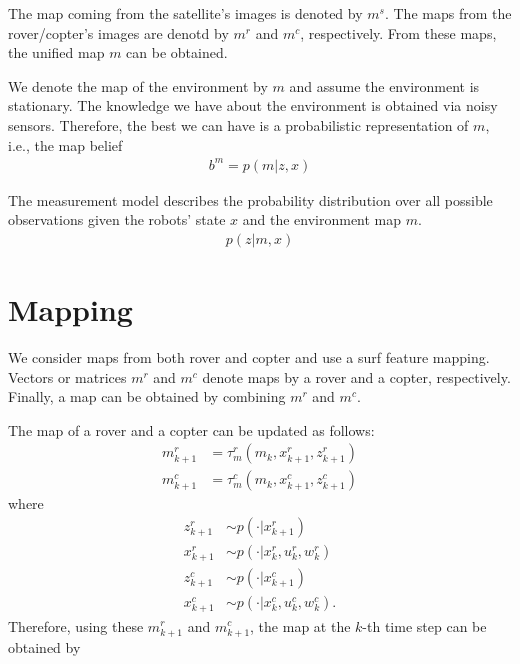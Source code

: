 \documentclass[conference]{IEEEtran}
\begin{document}
The map coming from the satellite's images is denoted by $m^s$. The maps from the rover/copter's images are denotd by $m^r$ and $m^c$, respectively. From these maps, the unified map $m$ can be obtained.

We denote the map of the environment by $m$ and assume the environment is stationary. The knowledge we have about the environment is obtained via noisy sensors. Therefore, the best we can have is a probabilistic representation of $m$, i.e., the map belief
\begin{align}
    b^m=p(m|z, x)
\end{align}

The measurement model describes the probability distribution over all possible observations given the robots' state $x$ and the environment map $m$.
\begin{align}
    p(z|m, x)
\end{align}




\section{Mapping}

We consider maps from both rover and copter and use a surf feature mapping. Vectors or matrices $m^r$ and $m^c$ denote maps by a rover and a copter, respectively. Finally, a map can be obtained by combining $m^r$ and $m^c$.

The map of a rover and a copter can be updated as follows:
\begin{align}
    m^r_{k+1}&=\tau^r_m (m_k, x^r_{k+1}, z^r_{k+1})\\
    m^c_{k+1}&=\tau^c_m (m_k, x^c_{k+1}, z^c_{k+1})
\end{align}
where
\begin{align}
    z^r_{k+1} &\sim p(\cdot |x^r_{k+1})\\
    x^r_{k+1} &\sim p(\cdot |x^r_k, u^r_k, w^r_k)\\
    z^c_{k+1} &\sim p(\cdot |x^c_{k+1})\\
    x^c_{k+1} &\sim p(\cdot |x^c_k, u^c_k, w^c_k).
\end{align}
Therefore, using these $m^r_{k+1}$ and $m^c_{k+1}$, the map at the $k$-th time step can be obtained by
\end{document}
